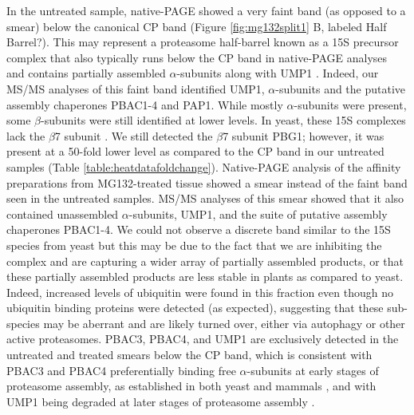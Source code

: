 In the untreated sample, native-PAGE showed a very faint band (as opposed to a smear) below the canonical CP band (Figure \ref{fig:mg132split1} B, labeled Half Barrel?). This may represent a proteasome half-barrel known as a 15S precursor complex that also typically runs below the CP band in native-PAGE analyses and contains partially assembled $\alpha$-subunits along with UMP1 \citep{kock15}. Indeed, our MS/MS analyses of this faint band identified UMP1, $\alpha$-subunits and the putative assembly chaperones PBAC1-4 and PAP1. While mostly $\alpha$-subunits were present, some $\beta$-subunits were still identified at lower levels. In yeast, these 15S complexes lack the $\beta$7 subunit \citep{kock15}. We still detected the $\beta$7 subunit PBG1; however, it was present at a 50-fold lower level as compared to the CP band in our untreated samples (Table \ref{table:heatdatafoldchange}). Native-PAGE analysis of the affinity preparations from MG132-treated tissue showed a smear instead of the faint band seen in the untreated samples. MS/MS analyses of this smear showed that it also contained unassembled $\alpha$-subunits, UMP1, and the suite of putative assembly chaperones PBAC1-4. We could not observe a discrete band similar to the 15S species from yeast but this may be due to the fact that we are inhibiting the complex and are capturing a wider array of partially assembled products, or that these partially assembled products are less stable in plants as compared to yeast. Indeed, increased levels of ubiquitin were found in this fraction even though no ubiquitin binding proteins were detected (as expected), suggesting that these sub-species may be aberrant and are likely turned over, either via autophagy or other active proteasomes. PBAC3, PBAC4, and UMP1 are exclusively detected in the untreated and treated smears below the CP band, which is consistent with PBAC3 and PBAC4 preferentially binding free $\alpha$-subunits at early stages of proteasome assembly, as established in both yeast and mammals \citep{kunjappu14}, and with UMP1 being degraded at later stages of proteasome assembly \citep{ramos98}.

